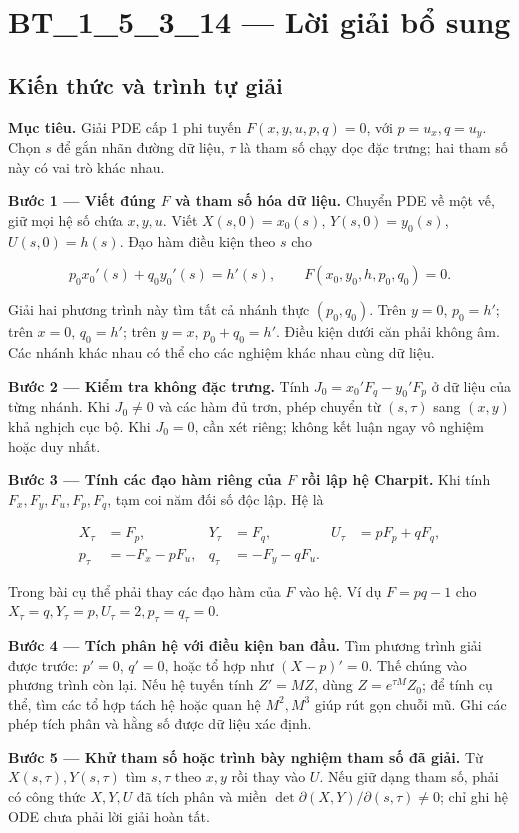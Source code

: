 \documentclass[10pt,a4paper]{article}
\begin{document}
\section*{BT\_1\_5\_3\_14 — Lời giải bổ sung}
\subsection*{Kiến thức và trình tự giải}
\textbf{Mục tiêu.} Giải PDE cấp 1 phi tuyến $F(x,y,u,p,q)=0$, với $p=u_x,q=u_y$. Chọn $s$ để gắn nhãn đường dữ liệu, $\tau$ là tham số chạy dọc đặc trưng; hai tham số này có vai trò khác nhau.

\textbf{Bước 1 — Viết đúng $F$ và tham số hóa dữ liệu.} Chuyển PDE về một vế, giữ mọi hệ số chứa $x,y,u$. Viết $X(s,0)=x_0(s)$, $Y(s,0)=y_0(s)$, $U(s,0)=h(s)$. Đạo hàm điều kiện theo $s$ cho

\[
p_0x_0'(s)+q_0y_0'(s)=h'(s),\qquad
F(x_0,y_0,h,p_0,q_0)=0.
\]

Giải hai phương trình này tìm tất cả nhánh thực $(p_0,q_0)$. Trên $y=0$, $p_0=h'$; trên $x=0$, $q_0=h'$; trên $y=x$, $p_0+q_0=h'$. Điều kiện dưới căn phải không âm. Các nhánh khác nhau có thể cho các nghiệm khác nhau cùng dữ liệu.

\textbf{Bước 2 — Kiểm tra không đặc trưng.} Tính $J_0=x_0'F_q-y_0'F_p$ ở dữ liệu của từng nhánh. Khi $J_0\ne0$ và các hàm đủ trơn, phép chuyển từ $(s,\tau)$ sang $(x,y)$ khả nghịch cục bộ. Khi $J_0=0$, cần xét riêng; không kết luận ngay vô nghiệm hoặc duy nhất.

\textbf{Bước 3 — Tính các đạo hàm riêng của $F$ rồi lập hệ Charpit.} Khi tính $F_x,F_y,F_u,F_p,F_q$, tạm coi năm đối số độc lập. Hệ là

\[
\begin{aligned}
X_\tau&=F_p,&Y_\tau&=F_q,&U_\tau&=pF_p+qF_q,\\
p_\tau&=-F_x-pF_u,&q_\tau&=-F_y-qF_u.
\end{aligned}
\]

Trong bài cụ thể phải thay các đạo hàm của $F$ vào hệ. Ví dụ $F=pq-1$ cho $X_\tau=q,Y_\tau=p,U_\tau=2,p_\tau=q_\tau=0$.

\textbf{Bước 4 — Tích phân hệ với điều kiện ban đầu.} Tìm phương trình giải được trước: $p'=0$, $q'=0$, hoặc tổ hợp như $(X-p)'=0$. Thế chúng vào phương trình còn lại. Nếu hệ tuyến tính $Z'=MZ$, dùng $Z=e^{\tau M}Z_0$; để tính cụ thể, tìm các tổ hợp tách hệ hoặc quan hệ $M^2, M^3$ giúp rút gọn chuỗi mũ. Ghi các phép tích phân và hằng số được dữ liệu xác định.

\textbf{Bước 5 — Khử tham số hoặc trình bày nghiệm tham số đã giải.} Từ $X(s,\tau),Y(s,\tau)$ tìm $s,\tau$ theo $x,y$ rồi thay vào $U$. Nếu giữ dạng tham số, phải có công thức $X,Y,U$ đã tích phân và miền $\det\partial(X,Y)/\partial(s,\tau)\ne0$; chỉ ghi hệ ODE chưa phải lời giải hoàn tất.
\end{document}
